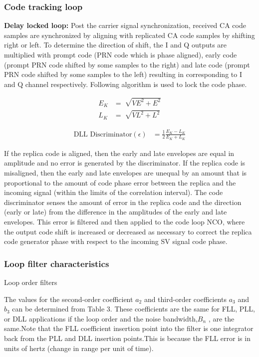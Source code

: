 \subsubsection{Code tracking loop}
\textbf{Delay locked loop:}
Post the carrier signal synchronization, received CA code samples are synchronized by aligning with replicated CA code samples by shifting right or left. To determine the direction of shift, the I and Q outputs are multiplied with prompt code (PRN code which is phase aligned), early code (prompt PRN code shifted by some samples to the right) and late code (prompt PRN code shifted by some samples to the left) resulting in corresponding to I and Q channel respectively. Following algorithm is used to lock the code phase.

\begin{align}
	E_K&=\sqrt[]{VE^2+E^2}\\
	L_K&=\sqrt[]{VL^2+L^2}
\end{align}

\begin{align}
	\text{DLL Discriminator} (\epsilon)&=\frac{1}{2}\frac{E_K-L_K}{E_K+L_K}
\end{align}

\noindent If the replica code is aligned, then the early and late envelopes are equal in amplitude and no error is generated by the discriminator. If the replica code is misaligned, then the early and late envelopes are unequal by an amount that is proportional to the amount of code phase error between the replica and the incoming signal (within the limits of the correlation interval). The code discriminator senses the amount of error in the replica code and the direction (early or late) from the difference in the amplitudes of the early and late envelopes. This
error is filtered and then applied to the code loop NCO, where the output code shift is increased or decreased as necessary to correct the replica code generator phase with respect to the incoming SV signal code phase.

\subsubsection{Loop filter characteristics}
\begin{table}[h]

\vspace{3mm}
\caption{Loop order filters}
\label{table:loop}
\end{table}
\noindent The values for the second-order coefficient $a_2$ and third-order coefficients $a_3$ and $b_3$ can be determined from Table 3. These coefficients are the same for FLL, PLL, or DLL applications if the loop
order and the noise bandwidth,$B_n$ , are the same.Note that the FLL coefficient insertion point into the filter is one integrator back from the PLL and DLL insertion points.This is because the FLL error is in units of hertz (change in range per unit of time).

